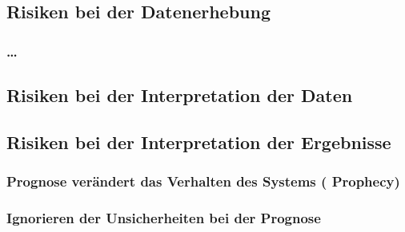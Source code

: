 \subsection{Risiken bei der Datenerhebung}

\subsubsection{\ldots}

\subsection{Risiken bei der Interpretation der Daten}

\subsection{Risiken bei der Interpretation der Ergebnisse}

\subsubsection{Prognose verändert das Verhalten des Systems 
  ( Prophecy\grqq)}

\subsubsection{Ignorieren der Unsicherheiten bei der Prognose}
